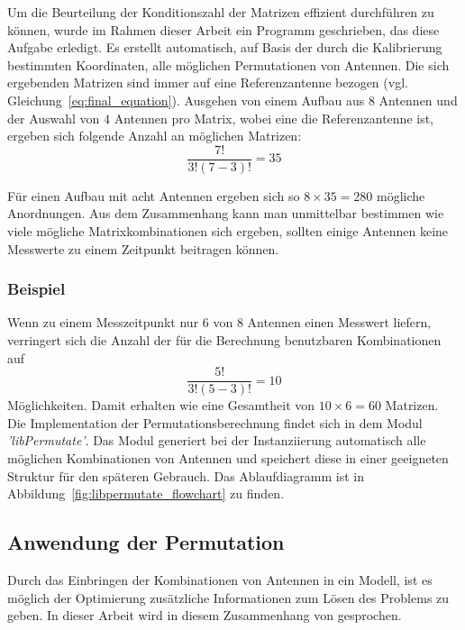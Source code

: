%

%
Um die Beurteilung der Konditionszahl der Matrizen effizient durchführen zu können, wurde im Rahmen dieser Arbeit ein Programm geschrieben, das diese Aufgabe erledigt. Es erstellt automatisch, auf Basis der durch die Kalibrierung bestimmten Koordinaten, alle möglichen Permutationen von Antennen. Die sich ergebenden Matrizen sind immer auf eine Referenzantenne bezogen (vgl. Gleichung~\ref{eq:final_equation}). Ausgehen von einem Aufbau aus $8$ Antennen und der Auswahl von $4$ Antennen pro Matrix, wobei eine die Referenzantenne ist, ergeben sich folgende Anzahl an möglichen Matrizen:
% 
\begin{equation}
	\frac{7!}{3!(7-3)!}=35
% 
\end{equation}

%
Für einen Aufbau mit acht Antennen ergeben sich so $8\times 35 = 280$ mögliche Anordnungen. Aus dem Zusammenhang kann man unmittelbar bestimmen wie viele mögliche Matrixkombinationen sich ergeben, sollten einige Antennen keine Messwerte zu einem Zeitpunkt beitragen können.
%
\subsubsection{Beispiel}
%
Wenn zu einem Messzeitpunkt nur $6$ von $8$ Antennen einen Messwert liefern, verringert sich die Anzahl der für die Berechnung benutzbaren Kombinationen auf
%
\begin{equation}
	\frac{5!}{3!(5-3)!}=10 \nonumber
% 
\end{equation}
Möglichkeiten. Damit erhalten wie eine Gesamtheit von $10\times6=60$ Matrizen. \\
%

Die Implementation  der Permutationsberechnung findet sich in dem Modul \textit{'libPermutate'}. Das Modul generiert bei der Instanziierung automatisch alle möglichen Kombinationen von Antennen und speichert diese in einer geeigneten Struktur für den späteren Gebrauch. Das Ablaufdiagramm ist in Abbildung~\ref{fig:libpermutate_flowchart} zu finden.\\
%
\subsection{Anwendung der Permutation}
\label{sec:Groupsize}
%
Durch das Einbringen der Kombinationen von Antennen in ein Modell, ist es möglich der Optimierung zusätzliche Informationen zum Lösen des Problems zu geben. In dieser Arbeit wird in diesem Zusammenhang von  gesprochen.

